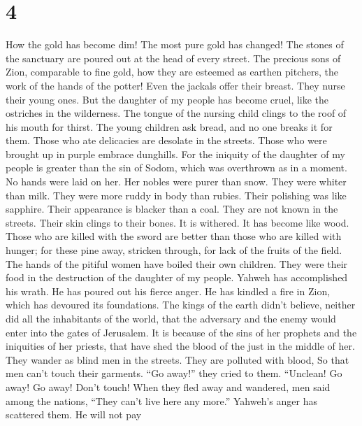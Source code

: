 \hypertarget{section-3}{%
\section{4}\label{section-3}}

 How the gold has become dim! The most pure gold has
changed! The stones of the sanctuary are poured out at the head of every
street.  The precious sons of Zion, comparable to fine gold,
how they are esteemed as earthen pitchers, the work of the hands of the
potter!  Even the jackals offer their breast. They nurse
their young ones. But the daughter of my people has become cruel, like
the ostriches in the wilderness.  The tongue of the nursing
child clings to the roof of his mouth for thirst. The young children ask
bread, and no one breaks it for them.  Those who ate
delicacies are desolate in the streets. Those who were brought up in
purple embrace dunghills.  For the iniquity of the daughter
of my people is greater than the sin of Sodom, which was overthrown as
in a moment. No hands were laid on her.  Her nobles were
purer than snow. They were whiter than milk. They were more ruddy in
body than rubies. Their polishing was like sapphire.  Their
appearance is blacker than a coal. They are not known in the streets.
Their skin clings to their bones. It is withered. It has become like
wood.  Those who are killed with the sword are better than
those who are killed with hunger; for these pine away, stricken through,
for lack of the fruits of the field.  The hands of the
pitiful women have boiled their own children. They were their food in
the destruction of the daughter of my people.  Yahweh has
accomplished his wrath. He has poured out his fierce anger. He has
kindled a fire in Zion, which has devoured its foundations.
 The kings of the earth didn't believe, neither did all the
inhabitants of the world, that the adversary and the enemy would enter
into the gates of Jerusalem.  It is because of the sins of
her prophets and the iniquities of her priests, that have shed the blood
of the just in the middle of her.  They wander as blind men
in the streets. They are polluted with blood, So that men can't touch
their garments.  ``Go away!'' they cried to them.
``Unclean! Go away! Go away! Don't touch! When they fled away and
wandered, men said among the nations, ``They can't live here any more.''
 Yahweh's anger has scattered them. He will not pay

